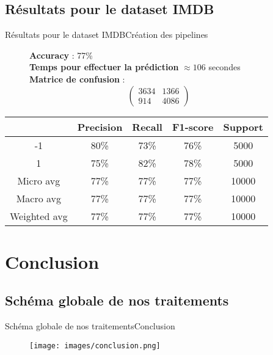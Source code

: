 \documentclass[usenames,dvipsnames]{beamer}
\begin{document}
\subsection{Résultats pour le dataset IMDB}
\begin{frame}{Résultats pour le dataset IMDB}{Création des pipelines}
\begin{figure}[!ht]
  \centering
  \textbf{Accuracy} : 77\% \\
  \textbf{Temps pour effectuer la prédiction} $\approx106$ secondes \\
  \textbf{Matrice de confusion} :
  $$
  \begin{pmatrix}
  3634 & 1366 \\
  914 & 4086
  \end{pmatrix}
  $$
\end{figure}

\begin{table}
  \centering
  \begin{tabular}{|c||c|c|c|c|}
    \hline
     & \textbf{Precision} & \textbf{Recall} & \textbf{F1-score} & \textbf{Support}\\
    \hline
    \hline
    -1 & 80\% & 73\% & 76\% & 5000\\
    \hline
    1 & 75\% & 82\% & 78\% & 5000\\
    \hline
    Micro avg & 77\% & 77\% & 77\% & 10000\\
    \hline
    Macro avg & 77\% & 77\% & 77\% & 10000\\
    \hline
    Weighted avg & 77\% & 77\% & 77\% & 10000\\
    \hline
  \end{tabular}
\end{table}
\end{frame}

\section{Conclusion}
\subsection{Schéma globale de nos traitements}
\begin{frame}{Schéma globale de nos traitements}{Conclusion}
\begin{figure}
    \centering
    \texttt{[image: images/conclusion.png]}
\end{figure}
\end{frame}
\end{document}
